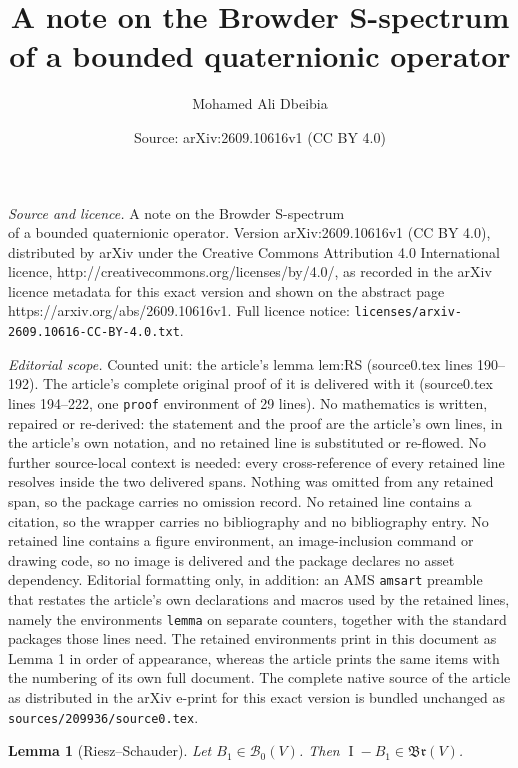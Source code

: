 \documentclass[10pt,a4paper]{amsart}
\title{A note on the Browder S-spectrum\\ of a bounded quaternionic operator}
\author{Mohamed Ali Dbeibia}
\date{Source: arXiv:2609.10616v1 (CC BY 4.0)}
\newtheorem{lemma}{Lemma}
\newcommand{\Bo}{\mathcal B_0}
\newcommand{\Br}{\mathfrak{Br}}
\DeclareMathOperator{\Id}{I}
\newcommand{\V}{V}
\begin{document}
\maketitle

\noindent\emph{Source and licence.} A note on the Browder S-spectrum\\ of a bounded quaternionic operator. Version arXiv:2609.10616v1 (CC BY 4.0), distributed by arXiv under the Creative Commons Attribution 4.0 International licence, http://creativecommons.org/licenses/by/4.0/, as recorded in the arXiv licence metadata for this exact version and shown on the abstract page https://arxiv.org/abs/2609.10616v1. Full licence notice: \texttt{licenses/arxiv-2609.10616-CC-BY-4.0.txt}.\par\smallskip

\noindent\textit{Editorial scope.} Counted unit: the article's lemma lem:RS (source0.tex lines 190--192). The article's complete original proof of it is delivered with it (source0.tex lines 194--222, one \texttt{proof} environment of 29 lines). No mathematics is written, repaired or re-derived: the statement and the proof are the article's own lines, in the article's own notation, and no retained line is substituted or re-flowed.  No further source-local context is needed: every cross-reference of every retained line resolves inside the two delivered spans.  Nothing was omitted from any retained span, so the package carries no omission record.  No retained line contains a citation, so the wrapper carries no bibliography and no bibliography entry.  No retained line contains a figure environment, an image-inclusion command or drawing code, so no image is delivered and the package declares no asset dependency.  Editorial formatting only, in addition: an AMS \texttt{amsart} preamble that restates the article's own declarations and macros used by the retained lines, namely the environments \texttt{lemma} on separate counters, together with the standard packages those lines need.  The retained environments print in this document as Lemma 1 in order of appearance, whereas the article prints the same items with the numbering of its own full document.  The complete native source of the article as distributed in the arXiv e-print for this exact version is bundled unchanged as \texttt{sources/209936/source0.tex}.
\begin{lemma}[Riesz--Schauder]\label{lem:RS}
Let $B_1\in\Bo(\V)$. Then $\Id-B_1\in\Br(\V)$.
\end{lemma}
\end{document}
